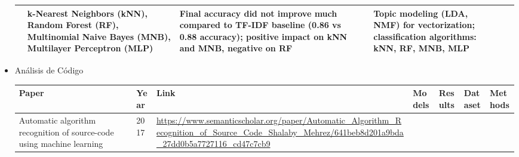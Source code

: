\documentclass{article}
\begin{document}
\begin{itemize}
\begin{longtable}{|p{2cm}|p{0.8cm}|p{2cm}|p{2cm}|p{3cm}|p{2cm}|p{3cm}|}
                             & k-Nearest Neighbors (kNN), Random Forest (RF), Multinomial Naive Bayes (MNB), Multilayer Perceptron (MLP) 
                             & Final accuracy did not improve much compared to TF-IDF baseline (0.86 vs 0.88 accuracy); positive impact on kNN and MNB, negative on RF 
                             & 
                             & Topic modeling (LDA, NMF) for vectorization; classification algorithms: kNN, RF, MNB, MLP                                                                                                                                                                      \\
              
              \hline
              
          \end{longtable}
          
    \item Análisis de Código
          
          \begin{longtable}{|p{2cm}|p{0.8cm}|p{2cm}|p{2cm}|p{3cm}|p{2cm}|p{3cm}|}
              \hline
              \textbf{Paper} & \textbf{Year}                                                                                                                                                                                                                                                                                               & \textbf{Link} & \textbf{Models} & \textbf{Results} & \textbf{Dataset} & \textbf{Methods} \\
              \hline
              \endfirsthead
              
              \hline
              \endfoot
              
              \hline
              \endlastfoot
              
              
              Automatic algorithm recognition of source-code using machine
              learning
                             & 2017
                             & \href{https://www.semanticscholar.org/paper/Automatic_Algorithm_Recognition_of_Source_Code_Shalaby_Mehrez/641beb8d201a9bda_27dd0b5a7727116_cd47c7cb9}{\url{https://www.semanticscholar.org/paper/Automatic_Algorithm_Recognition_of_Source_Code_Shalaby_Mehrez/641beb8d201a9bda_27dd0b5a7727116_cd47c7cb9}}

              
              
              
              

\end{longtable}
\end{itemize}
\end{document}

